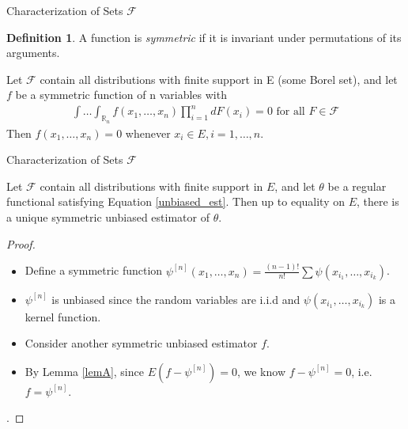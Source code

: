 \documentclass{beamer}
\newcommand{\R}{{\mathbb{R}}}
\theoremstyle{definition}
\newtheorem{Def}{Definition}
\numberwithin{Def}{section}
\begin{document}
\begin{frame}{Characterization of Sets $\mathcal{F}$}
\begin{Def}
A function is \textit{symmetric} if it is invariant under permutations of its arguments. 
\end{Def}

\pause
\begin{Lemma}\label{lemA}
Let $\mathcal{F}$ contain all distributions with finite support in E (some Borel set), and let $f$ be a symmetric function of n variables with 
    \begin{align*}
        \int \dotsc \int_{\R_n} f(x_1, \dotsc, x_n) \prod_{i=1}^n dF(x_i) = 0 \text{ for all } F \in \mathcal{F}
    \end{align*}
    Then $f(x_1, \dotsc, x_n) = 0$ whenever $x_i \in E, i = 1, \dotsc, n$. 
\end{Lemma}
\end{frame}

\begin{frame}{Characterization of Sets $\mathcal{F}$}

\begin{theorem}\label{unique}
Let $\mathcal{F}$ contain all distributions with finite support in $E$, and let $\theta$ be a regular functional satisfying Equation \ref{unbiased_est}. Then up to equality on $E$, there is a unique symmetric unbiased estimator of $\theta$.
\end{theorem}
\pause 
\begin{proof}
\begin{itemize}
    \item Define a symmetric function $\psi^{[n]}(x_1, \dotsc, x_n) = \frac{(n-1)!}{n!}\sum \psi(x_{i_1}, \dotsc, x_{i_k})$.
    \item $\psi^{[n]}$ is unbiased since the random variables are i.i.d and $\psi(x_{i_1}, \dotsc, x_{i_k})$ is a kernel function.

    \item Consider another symmetric unbiased estimator $f$.

    \item By Lemma \ref{lemA}, since $E(f - \psi^{[n]}) = 0$, we know $f - \psi^{[n]} = 0$, i.e. $f = \psi^{[n]}$.
\end{itemize}   . 
\end{proof}
\end{frame}
\end{document}
